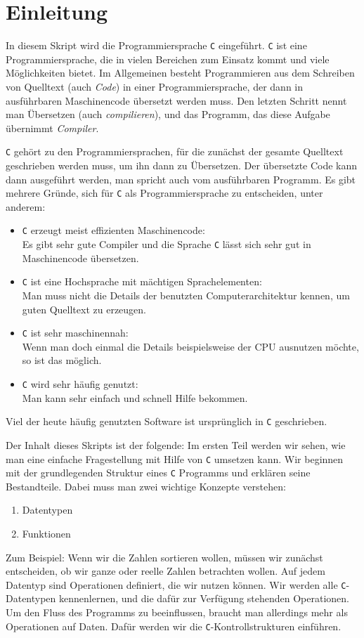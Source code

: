 \section{Einleitung}

In diesem Skript wird die Programmiersprache \texttt{C} eingeführt. 
\texttt{C} ist eine Programmiersprache, die in vielen Bereichen zum Einsatz kommt und viele Möglichkeiten bietet.
Im Allgemeinen besteht Programmieren aus dem Schreiben von Quelltext (auch \emph{Code}) in einer Programmiersprache, der dann in ausführbaren Maschinencode übersetzt werden muss. 
Den letzten Schritt nennt man Übersetzen (auch \emph{compilieren}), und das Programm, das diese Aufgabe übernimmt \emph{Compiler}.

\texttt{C} gehört zu den Programmiersprachen, für die zunächst der gesamte Quelltext geschrieben werden muss, um ihn dann zu Übersetzen. 
Der übersetzte Code kann dann ausgeführt werden, man spricht auch vom ausführbaren Programm.
Es gibt mehrere Gründe, sich für \texttt{C} als Programmiersprache zu entscheiden, unter anderem:
\begin{itemize}
\item \texttt{C} erzeugt meist effizienten Maschinencode:\\
  Es gibt sehr gute Compiler und die Sprache \texttt{C} lässt sich sehr gut in Maschinencode übersetzen.
\item \texttt{C} ist eine Hochsprache mit mächtigen Sprachelementen:\\
  Man muss nicht die Details der benutzten Computerarchitektur kennen, um guten Quelltext zu erzeugen.
\item \texttt{C} ist sehr maschinennah:\\
  Wenn man doch einmal die Details beispielsweise der CPU ausnutzen möchte, so ist das möglich.
\item \texttt{C} wird sehr häufig genutzt:\\
  Man kann sehr einfach und schnell Hilfe bekommen.
\end{itemize}
Viel der heute häufig genutzten Software ist ursprünglich in \texttt{C} geschrieben.

Der Inhalt dieses Skripts ist der folgende: Im ersten Teil werden wir sehen, wie man eine einfache Fragestellung mit Hilfe von \texttt{C} umsetzen kann.
Wir beginnen mit der grundlegenden Struktur eines \texttt{C} Programms und erklären seine Bestandteile.
Dabei muss man zwei wichtige Konzepte verstehen:
\begin{enumerate}
\item Datentypen
\item Funktionen
\end{enumerate}
Zum Beispiel: Wenn wir die Zahlen sortieren wollen, müssen wir zunächst entscheiden, ob wir ganze oder reelle Zahlen betrachten wollen.
Auf jedem Datentyp sind Operationen definiert, die wir nutzen können.
Wir werden alle \texttt{C}-Datentypen kennenlernen, und die dafür zur Verfügung stehenden Operationen.
Um den Fluss des Programms zu beeinflussen, braucht man allerdings mehr als Operationen auf Daten.
Dafür werden wir die \texttt{C}-Kontrollstrukturen einführen.

